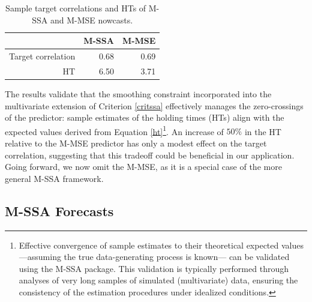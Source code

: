 \documentclass[a4paper]{article}
\begin{document}
\begin{table}[ht]
\centering
\begin{tabular}{rrr}
  \hline
 & M-SSA & M-MSE \\ 
  \hline
Target correlation & 0.68 & 0.69 \\ 
  HT & 6.50 & 3.71 \\ 
   \hline
\end{tabular}
\caption{Sample target correlations and HTs of M-SSA and M-MSE nowcasts.  } 
\label{corhtnow}
\end{table}The results validate that the smoothing constraint incorporated into the multivariate extension of Criterion \eqref{critssa} effectively manages the zero-crossings of the predictor: sample estimates of the holding times (HTs) align with the expected values derived from Equation \eqref{ht}\footnote{Effective convergence of sample estimates to their theoretical expected values —assuming the true data-generating process is known— can be validated using the M-SSA package. This validation is typically performed through analyses of very long samples of simulated (multivariate) data, ensuring the consistency of the estimation procedures under idealized conditions.}. An increase of $50\%$ in the HT relative to the M-MSE predictor has only a modest effect on the target correlation, suggesting that this tradeoff could be beneficial in our application. Going forward, we now omit the M-MSE, as it is a special case of the more general M-SSA framework.


\subsection{M-SSA Forecasts}
\end{document}
